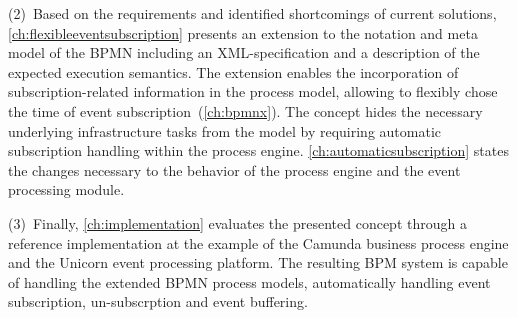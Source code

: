(2)~Based on the requirements and identified shortcomings of current solutions, \autoref{ch:flexibleeventsubscription} presents an extension to the notation and meta model of the BPMN including an XML-specification and a description of the expected execution semantics. 
The extension enables the incorporation of subscription-related information in the process model, allowing to flexibly chose the time of event subscription~(\autoref{ch:bpmnx}).
The concept hides the necessary underlying infrastructure tasks from the model by requiring automatic subscription handling within the process engine.
\autoref{ch:automaticsubscription} states the changes necessary to the behavior of the process engine and the event processing module. %


(3)~Finally, \autoref{ch:implementation} evaluates the presented concept through a reference implementation at the example of the Camunda business process engine and the Unicorn event processing platform.
The resulting BPM system is capable of handling the extended BPMN process models, automatically handling event subscription, un-subscrption and event buffering.

